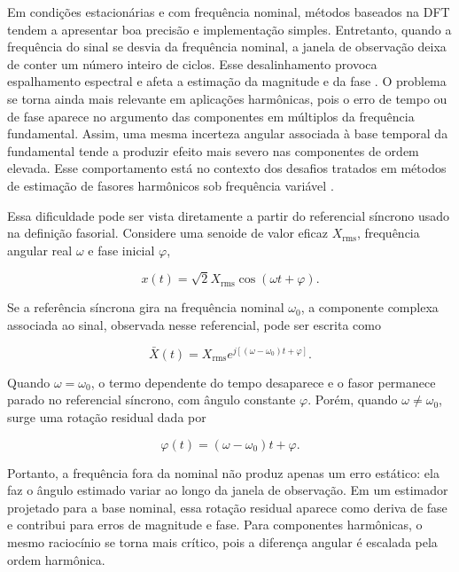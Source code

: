 Em condições estacionárias e com frequência nominal, métodos baseados na DFT tendem a apresentar boa precisão e implementação simples. Entretanto, quando a frequência do sinal se desvia da frequência nominal, a janela de observação deixa de conter um número inteiro de ciclos. Esse desalinhamento provoca espalhamento espectral e afeta a estimação da magnitude e da fase \cite{phadke2008,harris78}. O problema se torna ainda mais relevante em aplicações harmônicas, pois o erro de tempo ou de fase aparece no argumento das componentes em múltiplos da frequência fundamental. Assim, uma mesma incerteza angular associada à base temporal da fundamental tende a produzir efeito mais severo nas componentes de ordem elevada. Esse comportamento está no contexto dos desafios tratados em métodos de estimação de fasores harmônicos sob frequência variável \cite{duda2019,aleixo2022}.

Essa dificuldade pode ser vista diretamente a partir do referencial síncrono usado na definição fasorial. Considere uma senoide de valor eficaz $X_{\mathrm{rms}}$, frequência angular real $\omega$ e fase inicial $\varphi$,

\begin{equation}
x(t)=\sqrt{2}X_{\mathrm{rms}}\cos(\omega t+\varphi).
\label{eq:cap2_senoide_freq_real}
\end{equation}

\noindent Se a referência síncrona gira na frequência nominal $\omega_0$, a componente complexa associada ao sinal, observada nesse referencial, pode ser escrita como

\begin{equation}
\bar{X}(t)=X_{\mathrm{rms}}e^{j[(\omega-\omega_0)t+\varphi]}.
\label{eq:cap2_fasor_referencial_sincrono}
\end{equation}

\noindent Quando $\omega=\omega_0$, o termo dependente do tempo desaparece e o fasor permanece parado no referencial síncrono, com ângulo constante $\varphi$. Porém, quando $\omega\neq\omega_0$, surge uma rotação residual dada por

\begin{equation}
\varphi(t)=(\omega-\omega_0)t+\varphi.
\label{eq:cap2_fase_residual_freq}
\end{equation}

\noindent Portanto, a frequência fora da nominal não produz apenas um erro estático: ela faz o ângulo estimado variar ao longo da janela de observação. Em um estimador projetado para a base nominal, essa rotação residual aparece como deriva de fase e contribui para erros de magnitude e fase. Para componentes harmônicas, o mesmo raciocínio se torna mais crítico, pois a diferença angular é escalada pela ordem harmônica.

